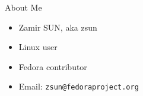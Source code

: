 \begin{frame}{About Me}
  \begin{itemize}
    \item Zamir SUN, aka zsun
    \item Linux user
    \item Fedora contributor
    \item Email: \texttt{zsun@fedoraproject.org}
  \end{itemize}
\end{frame}
